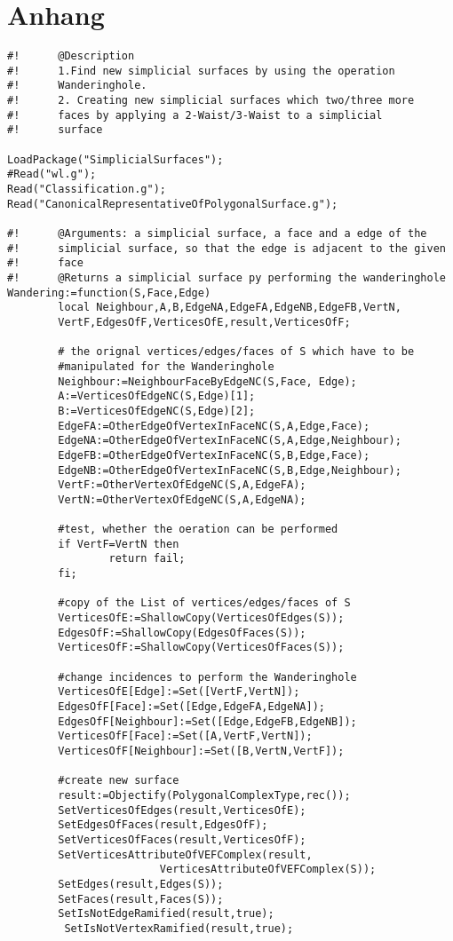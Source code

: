 \documentclass[12pt,titlepage,twoside,cleardoublepage]{article}
\theoremstyle{nummermitklammern}
\numberwithin{equation}{section}
\begin{document}
\section*{Anhang}
\pagestyle{empty}
\begin{linenumbers}
\begin{verbatim}
#!      @Description
#!      1.Find new simplicial surfaces by using the operation
#!      Wanderinghole.
#!      2. Creating new simplicial surfaces which two/three more  
#!      faces by applying a 2-Waist/3-Waist to a simplicial 
#!      surface

LoadPackage("SimplicialSurfaces");
#Read("wl.g");
Read("Classification.g");
Read("CanonicalRepresentativeOfPolygonalSurface.g");

#!      @Arguments: a simplicial surface, a face and a edge of the
#!      simplicial surface, so that the edge is adjacent to the given 
#!      face
#!      @Returns a simplicial surface py performing the wanderinghole
Wandering:=function(S,Face,Edge)
        local Neighbour,A,B,EdgeNA,EdgeFA,EdgeNB,EdgeFB,VertN,
        VertF,EdgesOfF,VerticesOfE,result,VerticesOfF;

        # the orignal vertices/edges/faces of S which have to be
        #manipulated for the Wanderinghole
        Neighbour:=NeighbourFaceByEdgeNC(S,Face, Edge);
        A:=VerticesOfEdgeNC(S,Edge)[1];
        B:=VerticesOfEdgeNC(S,Edge)[2];
        EdgeFA:=OtherEdgeOfVertexInFaceNC(S,A,Edge,Face);
        EdgeNA:=OtherEdgeOfVertexInFaceNC(S,A,Edge,Neighbour);
        EdgeFB:=OtherEdgeOfVertexInFaceNC(S,B,Edge,Face);
        EdgeNB:=OtherEdgeOfVertexInFaceNC(S,B,Edge,Neighbour);
        VertF:=OtherVertexOfEdgeNC(S,A,EdgeFA);
        VertN:=OtherVertexOfEdgeNC(S,A,EdgeNA);

        #test, whether the oeration can be performed
        if VertF=VertN then
                return fail;
        fi;

        #copy of the List of vertices/edges/faces of S
        VerticesOfE:=ShallowCopy(VerticesOfEdges(S));
        EdgesOfF:=ShallowCopy(EdgesOfFaces(S));
        VerticesOfF:=ShallowCopy(VerticesOfFaces(S));

        #change incidences to perform the Wanderinghole
        VerticesOfE[Edge]:=Set([VertF,VertN]);
        EdgesOfF[Face]:=Set([Edge,EdgeFA,EdgeNA]);
        EdgesOfF[Neighbour]:=Set([Edge,EdgeFB,EdgeNB]);
        VerticesOfF[Face]:=Set([A,VertF,VertN]);
        VerticesOfF[Neighbour]:=Set([B,VertN,VertF]);

        #create new surface
        result:=Objectify(PolygonalComplexType,rec());
        SetVerticesOfEdges(result,VerticesOfE);
        SetEdgesOfFaces(result,EdgesOfF);
        SetVerticesOfFaces(result,VerticesOfF);
        SetVerticesAttributeOfVEFComplex(result,
                        VerticesAttributeOfVEFComplex(S));
        SetEdges(result,Edges(S));
        SetFaces(result,Faces(S));
        SetIsNotEdgeRamified(result,true);
         SetIsNotVertexRamified(result,true);


\end{verbatim}
\end{linenumbers}
\end{document}
